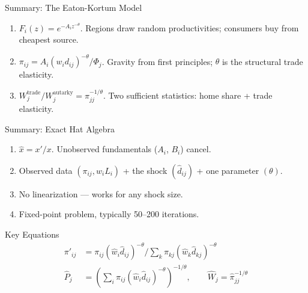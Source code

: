 \documentclass{beamer}
\begin{document}
\begin{frame}{Summary: The Eaton-Kortum Model}

    \begin{enumerate}
        \item {} $F_i(z) = e^{-A_i z^{-\theta}}$. Regions draw random productivities; consumers buy from cheapest source.
        \item {}
        $\pi_{ij} = A_i(w_i d_{ij})^{-\theta} / \Phi_j$.
        Gravity from first principles; $\theta$ is the structural trade elasticity.
        \item {} $W_j^{\text{trade}}/W_j^{\text{autarky}} = \pi_{jj}^{-1/\theta}$. Two sufficient statistics: home share + trade elasticity.
    \end{enumerate}

\end{frame}

\begin{frame}{Summary: Exact Hat Algebra}

    \begin{enumerate}
        \item {} $\hat{x} = x'/x$. Unobserved fundamentals ($A_i$, $B_i$) cancel.
        \item {} Observed data $(\pi_{ij}, w_i L_i)$ + the shock $(\hat{d}_{ij})$ + one parameter $(\theta)$.
        \item {} No linearization --- works for any shock size.
        \item {} Fixed-point problem, typically 50--200 iterations.
    \end{enumerate}

    \vspace{0.3em}
    \begin{block}{Key Equations}
    {\small
    \begin{align*}
        \pi'_{ij} &= \pi_{ij}(\hat{w}_i \hat{d}_{ij})^{-\theta} \Big/ \textstyle\sum_k \pi_{kj}(\hat{w}_k \hat{d}_{kj})^{-\theta} \\
        \hat{P}_j &= \left(\textstyle\sum_i \pi_{ij}(\hat{w}_i \hat{d}_{ij})^{-\theta}\right)^{-1/\theta}, \qquad \hat{W}_j = \hat{\pi}_{jj}^{-1/\theta}
    \end{align*}
    }
    \end{block}

\end{frame}
\end{document}
